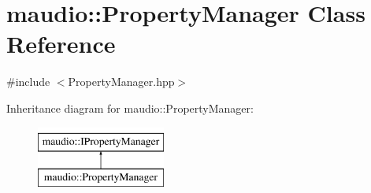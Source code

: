 \hypertarget{classmaudio_1_1PropertyManager}{\section{maudio\-:\-:Property\-Manager Class Reference}
\label{classmaudio_1_1PropertyManager}
}


{\ttfamily \#include $<$Property\-Manager.\-hpp$>$}

Inheritance diagram for maudio\-:\-:Property\-Manager\-:\begin{figure}[H]
\begin{center}
\leavevmode
\includegraphics[height=2.000000cm]{classmaudio_1_1PropertyManager}
\end{center}
\end{figure}
